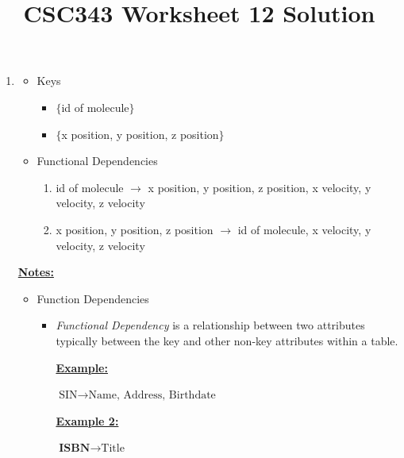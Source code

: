 \documentclass[12pt]{article}
\begin{document}
\title{CSC343 Worksheet 12 Solution}
\maketitle

\begin{enumerate}[1.]
    \item

    \begin{itemize}
        \item Keys
        \begin{itemize}
            \item $\{$id of molecule$\}$
            \item $\{$x position, y position, z position$\}$
        \end{itemize}
        \item Functional Dependencies
        \begin{enumerate}[1.]
            \item id of molecule $\to$ x position, y position, z position, x velocity, y velocity, z velocity
            \item x position, y position, z position $\to$ id of molecule, x velocity, y velocity, z velocity
        \end{enumerate}
    \end{itemize}

    \bigskip

    \underline{\textbf{Notes:}}

    \bigskip

    \begin{itemize}
        \item Function Dependencies
        \begin{itemize}
            \item \textit{Functional Dependency} is a relationship between two attributes
            typically between the key and other non-key attributes within a table.

            \bigskip

            \underline{\textbf{Example:}}

            \bigskip

            $\text{SIN} \to \text{Name, Address, Birthdate}$

            \bigskip

            \underline{\textbf{Example 2:}}

            \bigskip

            $\textbf{ISBN} \to \text{Title}$


\end{itemize}
\end{itemize}
\end{enumerate}
\end{document}
